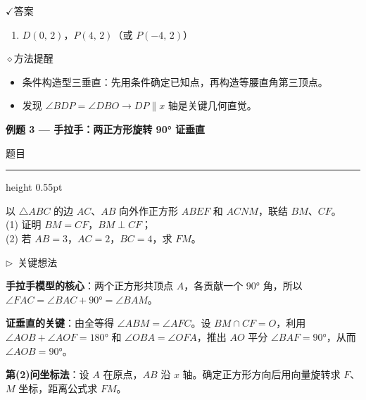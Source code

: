\documentclass{exam-zh}
\newcommand{\edukai}{\kaishu}
\newcommand{\eduSectionTitle}[1]{%
  \needspace{5\baselineskip}%
  \vspace{2mm}
  {\color{edu-blue}\bfseries\large #1}\par
  \vspace{3mm}
}
\newenvironment{eduAuxItem}[1]{%
  \needspace{4\baselineskip}%
  \vspace{2mm}
  \par\noindent
  \hangindent=8mm\hangafter=1
  {\color{edu-blue}\edukai $\triangleright$~#1}\enspace
  \begingroup
  \color{edu-ink}
  \edukai
}{%
  \endgroup
  \par
  \vspace{4mm}
}
\newcommand{\eduIconCheck}{\(\checkmark\)}
\newcommand{\eduIconPin}{\(\diamond\)}
\newenvironment{eduProblemBlock}[1][题目]{%
  \needspace{8\baselineskip}
  {\small\color{edu-muted}#1}\par
  \vspace{1.5mm}
  {\color{edu-blue}\hrule height 0.55pt}
  \vspace{4.5mm}
  \begingroup
  \color{edu-ink}
  \large
  \setlength{\parskip}{2.2mm}
  \linespread{1.20}\selectfont
}{%
  \par
  \endgroup
  \vspace{6mm}
}
\newenvironment{eduBulletList}{%
  \begin{itemize}[
    label=\textbullet,
    leftmargin=5mm,
    itemsep=1.2mm,
    topsep=0pt,
    parsep=0pt
  ]
}{%
  \end{itemize}
}
\newenvironment{eduBottomGrid}{%
  \vspace{1mm}
  \par\noindent
}{%
  \par\vspace{1mm}
}
\newenvironment{eduSummaryLeft}{%
  \begin{minipage}[t]{0.30\linewidth}
}{%
  \end{minipage}
}
\newcommand{\eduSummaryDivider}{%
  \hspace{4mm}{\color{edu-line}\vrule width 0.35pt}\hspace{7mm}%
}
\newenvironment{eduSummaryRight}{%
  \begin{minipage}[t]{0.58\linewidth}
}{%
  \end{minipage}
}
\newenvironment{eduPlainList}{%
  \begin{enumerate}[
    label=(\arabic*),
    leftmargin=7mm,
    itemsep=1.2mm,
    topsep=0pt,
    parsep=0pt
  ]
}{%
  \end{enumerate}
}
\begin{document}
\begin{eduBottomGrid}
  \begin{eduSummaryLeft}
    \begin{eduSummaryBlock}{\eduIconCheck}{答案}
    \begin{eduPlainList}
      \item $D(0,\,2)$，$P(4,\,2)$（或 $P(-4,\,2)$）    \end{eduPlainList}
    \end{eduSummaryBlock}
  \end{eduSummaryLeft}
  \eduSummaryDivider
  \begin{eduSummaryRight}
    \begin{eduSummaryBlock}{\eduIconPin}{方法提醒}
    \begin{eduBulletList}
      \item 条件构造型三垂直：先用条件确定已知点，再构造等腰直角第三顶点。      \item 发现 $\angle BDP = \angle DBO \to DP \parallel x$ 轴是关键几何直觉。    \end{eduBulletList}
    \end{eduSummaryBlock}
  \end{eduSummaryRight}
\end{eduBottomGrid}



\eduSectionTitle{例题 3 — 手拉手：两正方形旋转 90° 证垂直}

\begin{eduProblemBlock}[题目]
以 $\triangle ABC$ 的边 $AC$、$AB$ 向外作正方形 $ABEF$ 和 $ACNM$，联结 $BM$、$CF$。\\
(1) 证明 $BM = CF$，$BM \perp CF$；\\
(2) 若 $AB = 3$，$AC = 2$，$BC = 4$，求 $FM$。

\end{eduProblemBlock}









\begin{eduAuxItem}{关键想法}
\textbf{手拉手模型的核心}：两个正方形共顶点 $A$，各贡献一个 $90°$ 角，所以 $\angle FAC = \angle BAC + 90° = \angle BAM$。

\textbf{证垂直的关键}：由全等得 $\angle ABM = \angle AFC$。设 $BM \cap CF = O$，利用 $\angle AOB + \angle AOF = 180°$ 和 $\angle OBA = \angle OFA$，推出 $AO$ 平分 $\angle BAF = 90°$，从而 $\angle AOB = 90°$。

\textbf{第(2)问坐标法}：设 $A$ 在原点，$AB$ 沿 $x$ 轴。确定正方形方向后用向量旋转求 $F$、$M$ 坐标，距离公式求 $FM$。
\end{eduAuxItem}
\end{document}
